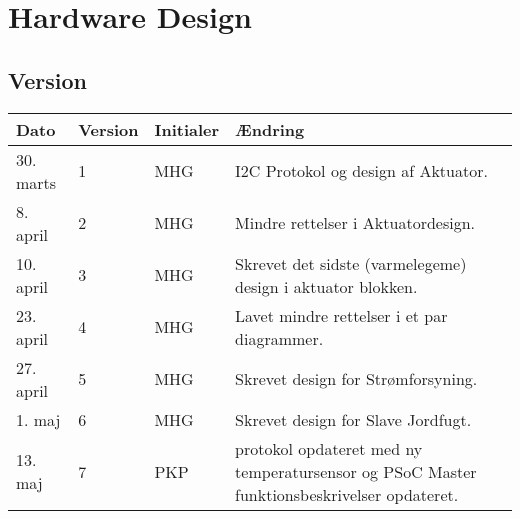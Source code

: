 
\chapter{Hardware Design} \label{ch:HwDesign}

\section{Version}
\begin{table}[h]
	\centering
	\begin{tabularx}{\textwidth - 2cm}{|l|l|l|X|}
	\hline
	Dato	& Version	& Initialer & Ændring	\\ \hline
	30. marts & 1 & MHG & I2C Protokol og design af Aktuator. \\ \hline
	8. april & 2 & MHG & Mindre rettelser i Aktuatordesign. \\ \hline
	10. april & 3 & MHG & Skrevet det sidste (varmelegeme) design i aktuator blokken. \\\hline 
	23. april & 4 & MHG & Lavet mindre rettelser i et par diagrammer. \\\hline
	27. april & 5 & MHG & Skrevet design for Strømforsyning. \\\hline
	1. maj & 6 & MHG & Skrevet design for Slave Jordfugt. \\\hline
	13. maj & 7 & PKP &\IIC protokol opdateret med ny temperatursensor og PSoC Master funktionsbeskrivelser opdateret. \\\hline
	\end{tabularx}
\end{table}



	

